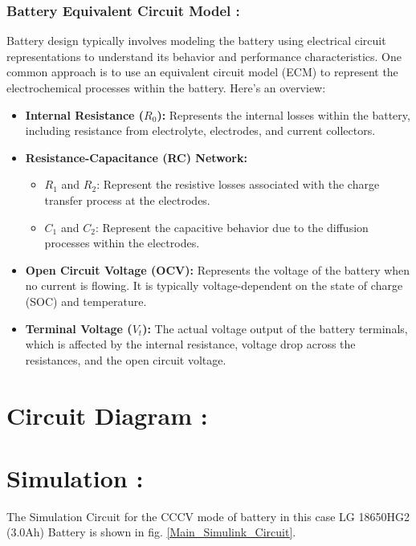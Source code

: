 \documentclass[conference]{IEEEtran}
\begin{document}
\subsubsection{Battery Equivalent Circuit Model :}
Battery design typically involves modeling the battery using electrical circuit representations to understand its behavior and performance characteristics. One common approach is to use an equivalent circuit model (ECM) to represent the electrochemical processes within the battery. Here's an overview:
\begin{itemize}
  \item \textbf{Internal Resistance ($R_0$):} Represents the internal losses within the battery, including resistance from electrolyte, electrodes, and current collectors.
  
  \item \textbf{Resistance-Capacitance (RC) Network:}
  \begin{itemize}
    \item $R_1$ and $R_2$: Represent the resistive losses associated with the charge transfer process at the electrodes.
    \item $C_1$ and $C_2$: Represent the capacitive behavior due to the diffusion processes within the electrodes.
  \end{itemize}
  
  \item \textbf{Open Circuit Voltage (OCV):} Represents the voltage of the battery when no current is flowing. It is typically voltage-dependent on the state of charge (SOC) and temperature.
  
  \item \textbf{Terminal Voltage ($V_t$):} The actual voltage output of the battery terminals, which is affected by the internal resistance, voltage drop across the resistances, and the open circuit voltage.
\end{itemize}


\section{Circuit Diagram :}

\section{Simulation :}
\hspace{0.5cm}The Simulation Circuit for the CCCV mode of battery in this case LG 18650HG2 (3.0Ah) Battery is shown in fig. \ref{Main_Simulink_Circuit}.
\end{document}
